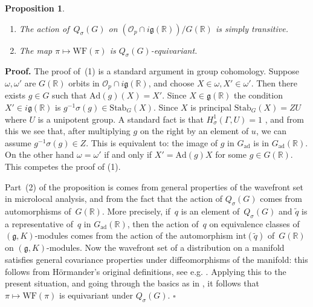 \documentclass[10pt,leqno]{article}
\newtheorem{proposition}[equation]{Proposition}
\newcommand{\qed}{\hfill $\square$ \medskip}
\newenvironment{proof}[1][Proof]{\noindent\textbf{#1.} }{\qed}
\newcommand{\Ad}{\mathrm{Ad}}
\newcommand{\Gad}{G_\mathrm{ad}}
\newcommand{\Stab}{\mathrm{Stab}}
\renewcommand{\O}{\mathcal O}
\newcommand{\R}{\mathbb R}
\newcommand{\g}{\mathfrak g}
\newcommand\inv{^{-1}}
\newcommand{\WF}{\mathrm{WF}}
\newcommand{\Op}{\O_p}
\begin{document}
\begin{proposition}\label{prop:action_on_real_orbits}
\begin{enumerate} 
\item The action of~$Q_{\sigma}(G)$ on $(\Op\cap i\g(\R))/G(\R)$ is simply transitive.
\item The map $\pi \mapsto \WF(\pi)$ is $Q_{\sigma}(G)$-equivariant.
\end{enumerate}
\end{proposition}

\begin{proof}
The proof of~(1) is a standard argument in group cohomology. Suppose $\omega,\omega'$ are $G(\R)$ orbits in $\Op\cap i\g(\R)$,
and choose $X\in \omega,X'\in\omega'$. Then there exists $g\in G$ such that $\Ad(g)(X)=X'$. Since $X\in \g(\R)$ the condition $X'\in i\g(\R)$ 
is $g\inv \sigma(g)\in \Stab_G(X)$.  Since $X$ is principal $\Stab_G(X)=ZU$ where $U$ is a unipotent group. 
A standard fact is that $H^1_\sigma(\Gamma,U)=1$ \cite[Chap.~III, Proposition~6]{Serre_Galois}, and from this we see that, after multiplying $g$ on the right by an element of $u$, we can assume $g\inv \sigma(g)\in Z$. This is equivalent to: the image of $g$ in $\Gad$ is in $\Gad(\R)$. On the other hand $\omega=\omega'$ 
if and only if $X'=\Ad(g)X$ for some $g\in G(\R)$. This competes the proof of (1).

Part~(2) of the proposition is comes from general properties of the wavefront set in microlocal analysis, and from the fact that the action of $Q_{\sigma}(G)$ comes from automorphisms of~$G(\R)$. More precisely, if~$q$ is an element of~$Q_{\sigma}(G)$ and $\tilde{q}$ is a representative of~$q$ in $\Gad(\R)$, then the action of~$q$ on equivalence classes of $(\g, K)$-modules comes from the action of the automorphism $\mathrm{int}(\tilde{q})$ of~$G(\R)$ on $(\g, K)$-modules. Now the wavefront set of a distribution on a manifold satisfies general covariance properties under diffeomorphisms of the manifold: this follows from Hörmander's original definitions, see e.g. \cite[Section 2, p.~800]{HarrisHeOlafsson}. Applying this to the present situation, and going through the basics as in   \cite[Section~2]{HarrisHeOlafsson}, it follows that $\pi \mapsto \WF(\pi)$ is equivariant under $Q_{\sigma}(G)$.
\end{proof}
\end{document}
